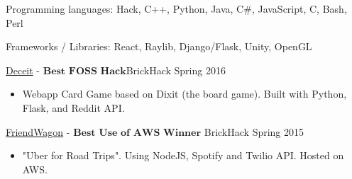 \documentclass[11pt]{article}
\begin{document}
\inlineskillsection  %
{Programming languages:}
{ Hack, C++, Python, Java, C\#, JavaScript, C, Bash, Perl }

\inlineskillsection  
{Frameworks / Libraries:}
{ React, Raylib, Django/Flask, Unity, OpenGL}



\spacedhrule{0.2em}{0.2em}  %

\projects
{{\href{https://github.com/gabeochoa/sokim}{Deceit}} - $\textbf{Best FOSS Hack}$}{BrickHack Spring 2016}
{
    \begin{itemize}[label={}]
        \setlength\itemsep{.005ex}
        \item{Webapp Card Game based on Dixit (the board game). Built with Python, Flask, and Reddit API.}
    \end{itemize}
}

\headedsubsection
{{\href{https://github.com/alanplotko/RoadTrip}{FriendWagon}} - $\textbf{Best Use of AWS Winner}$ }
{BrickHack Spring 2015}
{
    \begin{itemize}[label={}]
    	\setlength\itemsep{.005ex}
        \item{"Uber for Road Trips". Using NodeJS, Spotify and Twilio API. Hosted on AWS.}
    \end{itemize}
}
\end{document}
